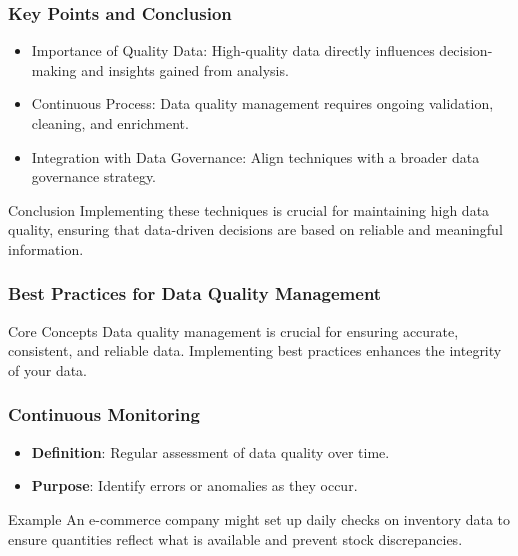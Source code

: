 \documentclass{beamer}
\begin{document}
\begin{frame}[fragile]
    \frametitle{Key Points and Conclusion}
    \begin{itemize}
        \item Importance of Quality Data: High-quality data directly influences decision-making and insights gained from analysis.
        \item Continuous Process: Data quality management requires ongoing validation, cleaning, and enrichment.
        \item Integration with Data Governance: Align techniques with a broader data governance strategy.
    \end{itemize}
    \begin{block}{Conclusion}
        Implementing these techniques is crucial for maintaining high data quality, ensuring that data-driven decisions are based on reliable and meaningful information.
    \end{block}
\end{frame}

\begin{frame}[fragile]
    \frametitle{Best Practices for Data Quality Management}
    \begin{block}{Core Concepts}
        Data quality management is crucial for ensuring accurate, consistent, and reliable data. 
        Implementing best practices enhances the integrity of your data.
    \end{block}
\end{frame}

\begin{frame}[fragile]
    \frametitle{Continuous Monitoring}
    \begin{itemize}
        \item \textbf{Definition}: Regular assessment of data quality over time.
        \item \textbf{Purpose}: Identify errors or anomalies as they occur.
    \end{itemize}
    \begin{block}{Example}
        An e-commerce company might set up daily checks on inventory data 
        to ensure quantities reflect what is available and prevent stock discrepancies.
    \end{block}
\end{frame}
\end{document}
